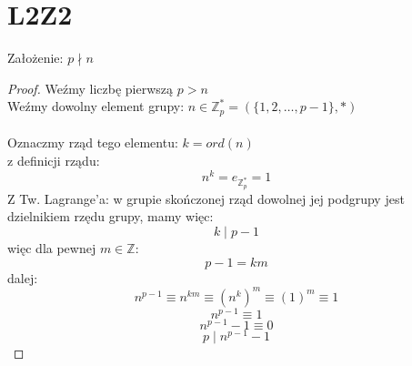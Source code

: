 \documentclass{article}
\title{}
\date{20.10.2020}
\author{Maurycy Borkowski}
\begin{document}
\maketitle

\section{L2Z2}
Założenie: $p \nmid n$\\
\begin{proof}
Weźmy liczbę pierwszą $p>n$\\
Weźmy dowolny element grupy: $n \in \mathbb{Z}_p^* = (\{1,2,\dots,p-1\},*)$\\\\
Oznaczmy rząd tego elementu: $k = ord(n)$\\
z definicji rządu:
$$
n^{k} = e_{\mathbb{Z}_p^*} = 1
$$
Z Tw. Lagrange'a: w grupie skończonej rząd dowolnej jej podgrupy jest dzielnikiem rzędu grupy, mamy więc:
$$
k \mid p-1
$$
więc dla pewnej $m \in \mathbb{Z}$:
$$
p-1 = km
$$
dalej:
$$
n^{p-1}  \equiv n^{km}  \equiv(n^k)^m  \equiv(1)^m \equiv 1
$$
$$
n^{p-1} \equiv 1
$$
$$
n^{p-1} - 1 \equiv 0
$$
$$
p \mid n^{p-1}-1
$$
\end{proof}
\end{document}
